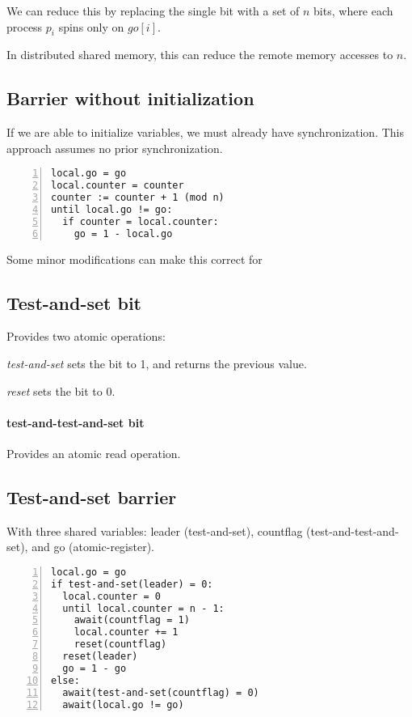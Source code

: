 \documentclass{idc_msc}
\begin{document}
We can reduce this by replacing the single bit with a set of $n$ bits, where each process $p_i$ spins only on $go[i]$.

In distributed shared memory, this can reduce the remote memory accesses to $n$.

\subsection{Barrier without initialization}

If we are able to initialize variables, we must already have synchronization. This approach assumes no prior synchronization.

\begin{lstlisting}[frame=L,mathescape=true,numbers=left,title={For process i in 0...n}]
local.go = go
local.counter = counter
counter := counter + 1 (mod n)
until local.go != go:
  if counter = local.counter:
    go = 1 - local.go
\end{lstlisting}

Some minor modifications can make this correct for 

\subsection{Test-and-set bit}

Provides two atomic operations:

\textit{test-and-set} sets the bit to 1, and returns the previous value.

\textit{reset} sets the bit to 0.

\paragraph{test-and-test-and-set bit}

Provides an atomic read operation.

\subsection{Test-and-set barrier}

With three shared variables: leader (test-and-set), countflag (test-and-test-and-set), and go (atomic-register).

\begin{lstlisting}[frame=L,mathescape=true,numbers=left,title={For process i in 0...n}]
local.go = go
if test-and-set(leader) = 0:
  local.counter = 0
  until local.counter = n - 1:
    await(countflag = 1)
    local.counter += 1
    reset(countflag)
  reset(leader)
  go = 1 - go
else:
  await(test-and-set(countflag) = 0)
  await(local.go != go)
\end{lstlisting}
\end{document}
